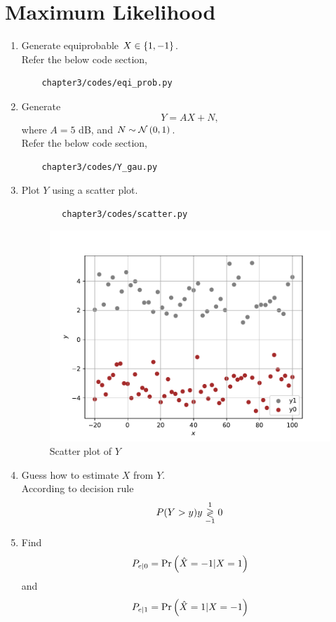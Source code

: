 
\section{Maximum Likelihood}
\begin{enumerate}
\item Generate equiprobable $X \in \left\{1,-1\right\}$.\\
\solution Refer the below code section,
\begin{lstlisting}
	chapter3/codes/eqi_prob.py
\end{lstlisting}
\item Generate 
\begin{equation}
Y = AX+N,
\end{equation}
where $A = 5$ dB,  and $N \sim \mathcal{N}\left(0,1\right)$.\\
\solution Refer the below code section,
\begin{lstlisting}
	chapter3/codes/Y_gau.py
\end{lstlisting}
\item Plot $Y$ using a scatter plot.\\
\solution 
\begin{lstlisting}
		chapter3/codes/scatter.py
\end{lstlisting}
\begin{figure}[H]
\centering
\includegraphics[scale=0.8]{chapter3/figs/bpsk_scatter.pdf}
\caption{Scatter plot of $Y$}
\label{fig:bpsk_scatter}
\end{figure}
\item Guess how to estimate $X$ from $Y$.\\
\solution
According to decision rule 
\begin{equation}
P(Y > y) \\
y \overset{1}{\underset{-1}{\gtrless}} 0
\label{eq:bpsk_decision}
\end{equation}
\item
\label{ml-ch4_sim}
Find 
\begin{equation}
	P_{e|0} = \Pr\left(\hat{X} = -1|X=1\right)
\end{equation}
and 
\begin{equation}
	P_{e|1} = \Pr\left(\hat{X} = 1|X=-1\right)
\end{equation}\\


\end{enumerate}
